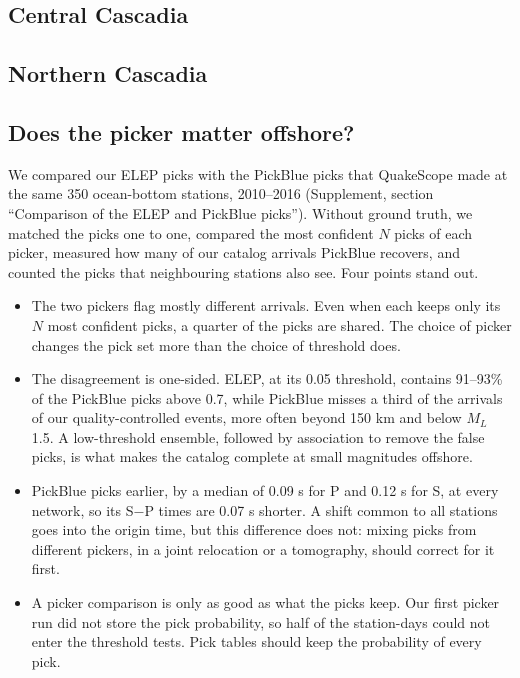 \documentclass[review]{seismica}
\providecommand{\tightlist}{\setlength{\itemsep}{0pt}\setlength{\parskip}{0pt}}
\begin{document}
\subsection{Central Cascadia}\label{central-cascadia}

\subsection{Northern Cascadia}\label{northern-cascadia}

\subsection{Does the picker matter
offshore?}\label{does-the-picker-matter-offshore}

We compared our ELEP picks with the PickBlue picks that QuakeScope made
at the same 350 ocean-bottom stations, 2010--2016 \citep{Bornstein23}
(Supplement, section ``Comparison of the ELEP and PickBlue picks'').
Without ground truth, we matched the picks one to one, compared the most
confident \(N\) picks of each picker, measured how many of our catalog
arrivals PickBlue recovers, and counted the picks that neighbouring
stations also see. Four points stand out.

\begin{itemize}
\tightlist
\item
  The two pickers flag mostly different arrivals. Even when each keeps
  only its \(N\) most confident picks, a quarter of the picks are
  shared. The choice of picker changes the pick set more than the choice
  of threshold does.
\item
  The disagreement is one-sided. ELEP, at its 0.05 threshold, contains
  91--93\% of the PickBlue picks above 0.7, while PickBlue misses a
  third of the arrivals of our quality-controlled events, more often
  beyond 150 km and below \(M_L\) 1.5. A low-threshold ensemble,
  followed by association to remove the false picks, is what makes the
  catalog complete at small magnitudes offshore.
\item
  PickBlue picks earlier, by a median of 0.09 s for P and 0.12 s for S,
  at every network, so its S\(-\)P times are 0.07 s shorter. A shift
  common to all stations goes into the origin time, but this difference
  does not: mixing picks from different pickers, in a joint relocation
  or a tomography, should correct for it first.
\item
  A picker comparison is only as good as what the picks keep. Our first
  picker run did not store the pick probability, so half of the
  station-days could not enter the threshold tests. Pick tables should
  keep the probability of every pick.
\end{itemize}
\end{document}
